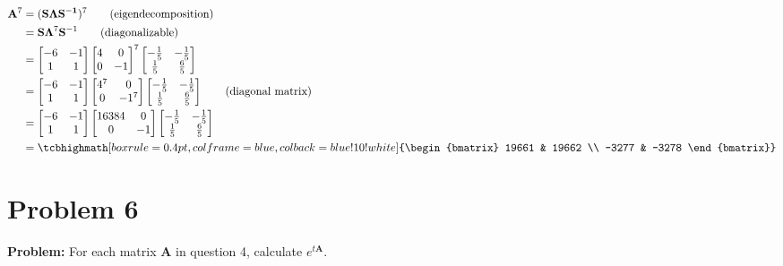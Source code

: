 \documentclass{article}
\begin{document}
\begin{align*}
    \mathbf{A}^7&=(\mathbf{S\Lambda S^{-1}})^7\tag{eigendecomposition}\\
    &=\mathbf{S\Lambda}^7 \mathbf{S}^{-1}\tag{diagonalizable}\\
    &=\begin{bmatrix} -6&-1\\1&1\end{bmatrix}\begin{bmatrix} 4&0\\0&-1\end{bmatrix}^7\begin{bmatrix} -\frac{1}{5}&-\frac{1}{5}\\\frac{1}{5}&\frac{6}{5}\end{bmatrix}\\
    &=\begin{bmatrix} -6&-1\\1&1\end{bmatrix}\begin{bmatrix} 4^7&0\\0&-1^7\end{bmatrix}\begin{bmatrix} -\frac{1}{5}&-\frac{1}{5}\\\frac{1}{5}&\frac{6}{5}\end{bmatrix}\tag{diagonal matrix}\\
    &=\begin{bmatrix} -6&-1\\1&1\end{bmatrix}\begin{bmatrix} 16384&0\\0&-1\end{bmatrix}\begin{bmatrix} -\frac{1}{5}&-\frac{1}{5}\\\frac{1}{5}&\frac{6}{5}\end{bmatrix}\\
    &=\tcbhighmath[boxrule=0.4pt,colframe=blue,colback=blue!10!white]{\begin{bmatrix} 19661 & 19662 \\ -3277 & -3278 \end{bmatrix}}
\end{align*}

\section*{Problem 6}
\noindent\textbf{Problem:} For each matrix $\mathbf{A}$ in question 4, calculate $e^{t\mathbf{A}}$.
\bigskip
\end{document}
